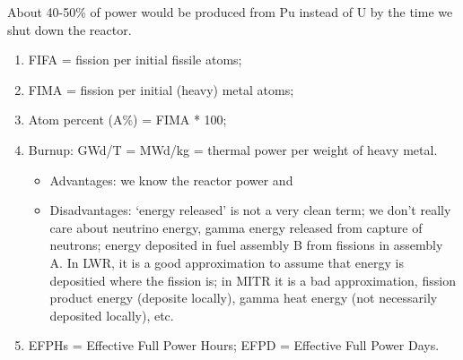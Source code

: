 \documentclass{school-22.211-notes}
\begin{document}
About 40-50\% of power would be produced from Pu instead of U by the time we shut down the reactor. 





\clearpage
{}
\begin{enumerate}
\item FIFA = fission per initial fissile atoms;
\item FIMA = fission per initial (heavy) metal atoms;
\item Atom percent (A\%) = FIMA * 100;
\item Burnup: GWd/T = MWd/kg = thermal power per weight of heavy metal. 
  \begin{itemize}
    \item Advantages: we know the reactor power and 
    \item Disadvantages: `energy released' is not a very clean term; we don't really care about neutrino energy, gamma energy released from capture of neutrons; energy deposited in fuel assembly B from fissions in assembly A. In LWR, it is a good approximation to assume that energy is depositied where the fission is; in MITR it is a bad approximation, fission product energy (deposite locally), gamma heat energy (not necessarily deposited locally), etc. 
  \end{itemize}
\item EFPHs = Effective Full Power Hours; EFPD = Effective Full Power Days. 
\end{enumerate}
\end{document}
